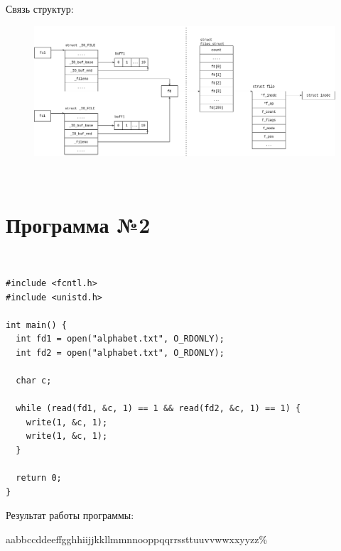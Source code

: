 Связь структур:
\begin{figure}[H]
  \centering
  \includegraphics[scale=0.5]{assets/d_1.png}
\end{figure}

~\newline
\section*{Программа №2}
~\newline
\begin{lstlisting}
#include <fcntl.h>
#include <unistd.h>

int main() {
  int fd1 = open("alphabet.txt", O_RDONLY);
  int fd2 = open("alphabet.txt", O_RDONLY);

  char c;

  while (read(fd1, &c, 1) == 1 && read(fd2, &c, 1) == 1) {
    write(1, &c, 1);
    write(1, &c, 1);
  }

  return 0;
}
\end{lstlisting}
Результат работы программы:

aabbccddeeffgghhiijjkkllmmnnooppqqrrssttuuvvwwxxyyzz\%

